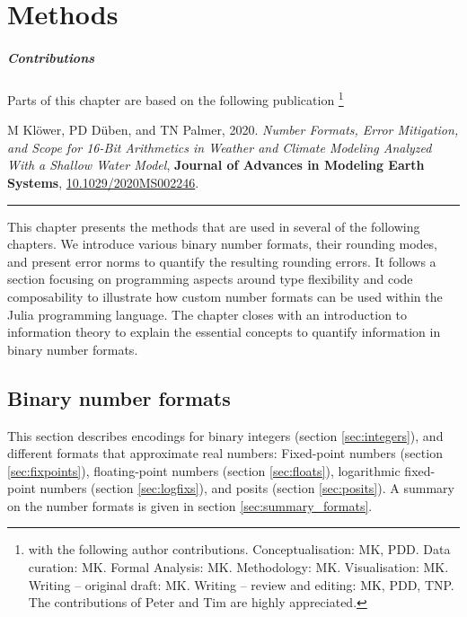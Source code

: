 \chapter{Methods}
\label{chap:methods}

{\onehalfspacing
\small \paragraph{Contributions} Parts of this chapter are based on the following publication \footnote{with the following author contributions.
Conceptualisation: MK, PDD. Data curation: MK. Formal Analysis: MK. Methodology: MK. Visualisation: MK. Writing – original draft:
MK. Writing – review and editing: MK, PDD, TNP. The contributions of Peter and Tim are highly appreciated.}

\vspace{\baselineskip}
\indent M Klöwer, PD Düben, and TN Palmer, 2020. \emph{Number Formats, Error Mitigation, and Scope for 16-Bit Arithmetics in Weather and Climate Modeling Analyzed With a Shallow Water Model}, \textbf{Journal of Advances in Modeling Earth Systems}, \href{https://doi.org/10.1029/2020MS002246}{10.1029/2020MS002246}.
\vspace{\baselineskip}}
\hrule
\vspace{\baselineskip}

This chapter presents the methods that are used in several of the following chapters. We introduce various binary number formats,
their rounding modes, and present error norms to quantify the resulting rounding errors. It follows a section focusing on
programming aspects around type flexibility and code composability to illustrate how custom number formats can be used within
the Julia programming language. The chapter closes with an introduction to information theory to explain the essential concepts
to quantify information in binary number formats.

\section{Binary number formats}
\label{sec:numbers}

This section describes encodings for binary integers (section \ref{sec:integers}), and different formats that approximate real numbers:
Fixed-point numbers (section \ref{sec:fixpoints}), floating-point numbers (section \ref{sec:floats}), logarithmic fixed-point numbers
(section \ref{sec:logfixs}), and posits (section \ref{sec:posits}). A summary on the number formats is given in section \ref{sec:summary_formats}.

